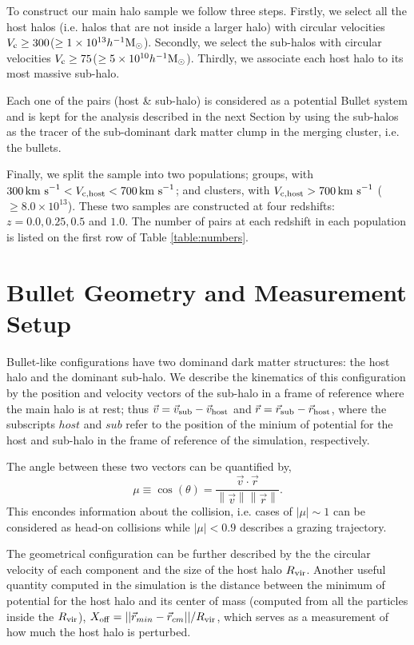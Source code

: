 \documentclass{emulateapj}
\newcommand{\hMsun}{{\ifmmode{h^{-1}{\rm {M_{\odot}}}}\else{$h^{-1}{\rm{M_{\odot}}}$}\fi}}
\newcommand{\kms}{{\ifmmode{{\mathrm{\,km\ s}^{-1}}}\else{\,km~s$^{-1}$}\fi}}
\begin{document}
To construct our main halo sample we follow three steps. Firstly, we
select all the host halos (i.e. halos that are not inside a larger
halo) with circular velocities $V_{\rm c}\geq 300$\kms ($\geq 1\times
10^{13} \hMsun$). Secondly, we select the sub-halos with circular
velocities $V_{\rm c}\geq 75$\kms ($\geq 5\times
10^{10}\hMsun$). Thirdly, we associate each host halo to its most
massive sub-halo.  

Each one of the pairs (host \& sub-halo) is considered as a
potential Bullet system and is kept for the analysis described in the
next Section  by using the sub-halos as the tracer of the sub-dominant
dark matter clump in the merging cluster, i.e. the bullets.  

Finally, we split the sample into two  populations; groups, with
$300\kms < V_{\rm c, host}<700\kms$; and clusters, with $V_{\rm
  c,host}>700\kms$ ($\geq 8.0\times 10^{13}$\hMsun). These two samples
are constructed at four redshifts: $z=0.0, 0.25, 0.5$ and $1.0$.  The
number of pairs at each redshift in each population is listed on the
first row of Table \ref{table:numbers}.  



\section{Bullet Geometry and Measurement Setup}
\label{sec:setup}

Bullet-like configurations have two dominand dark matter structures:
the host halo and the dominant sub-halo. We describe the kinematics of
this configuration by the  position and velocity vectors of the
sub-halo in a frame of reference where the main halo is at rest; thus
$\vec{v{}}=\vec{v}_{\rm sub}-\vec{v}_{\rm host}$ and
$\vec{r{}}=\vec{r}_{\rm sub}-\vec{r}_{\rm host}$, where the subscripts $host$
and $sub$ refer to the position of the minium of potential for the
host and sub-halo in the frame of reference of the simulation,
respectively.  

The angle between these two vectors can be quantified by, 
\begin{equation}
  \mu\equiv
  \cos(\theta)=\frac{\vec{v{}}\cdotp{}\vec{r}}{\left\|\vec{v}{}\right\|
    \left\|\vec{r}\right\|} .
 \end{equation} 
%
This encondes information about the collision, i.e. cases of
$|\mu|\sim 1$ can be considered as head-on collisions while
$|\mu|< 0.9$ describes a grazing trajectory.  

The geometrical configuration can be further described by the
the circular velocity of each component and the
size of the host halo $R_{\rm vir}$. Another useful quantity computed
in the simulation is the distance between the minimum of potential for
the host halo and its center of mass (computed from all the particles
inside the $R_{\rm vir}$), $X_{\rm
  off}=||\vec{r}_{min}-\vec{r}_{cm}||/R_{\rm vir}$, which serves as a
measurement of how much the host halo is perturbed.  
\end{document}
